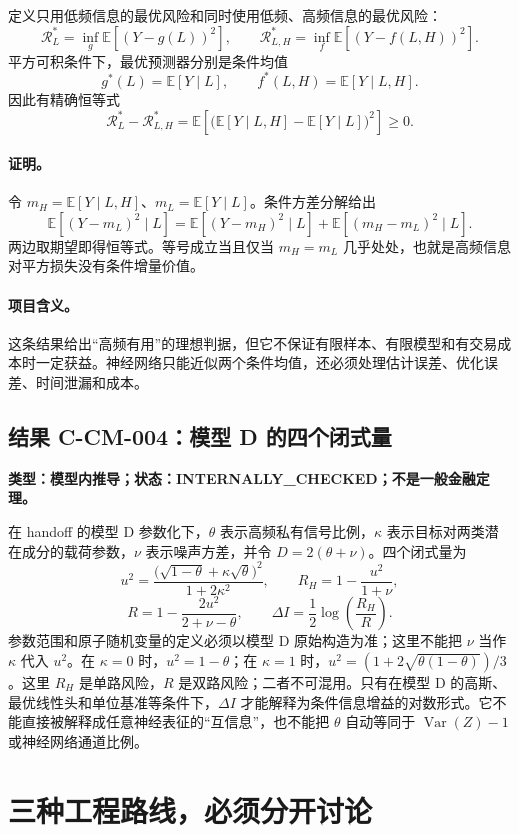 \documentclass[UTF8,11pt,a4paper]{ctexart}
\newcommand{\E}{\mathbb E}
\newcommand{\R}{\mathcal R}
\begin{document}
定义只用低频信息的最优风险和同时使用低频、高频信息的最优风险：
\[
 \R_L^*=\inf_g \E[(Y-g(L))^2],\qquad
 \R_{L,H}^*=\inf_f \E[(Y-f(L,H))^2].
\]
平方可积条件下，最优预测器分别是条件均值
\[
 g^*(L)=\E[Y\mid L],\qquad f^*(L,H)=\E[Y\mid L,H].
\]
因此有精确恒等式
\[
 \boxed{\R_L^*-\R_{L,H}^*
 =\E\!\left[\big(\E[Y\mid L,H]-\E[Y\mid L]\big)^2\right]\ge 0.}
\]

\paragraph{证明。} 令 $m_H=\E[Y\mid L,H]$、$m_L=\E[Y\mid L]$。条件方差分解给出
\[
 \E[(Y-m_L)^2\mid L]
 =\E[(Y-m_H)^2\mid L]+\E[(m_H-m_L)^2\mid L].
\]
两边取期望即得恒等式。等号成立当且仅当 $m_H=m_L$ 几乎处处，也就是高频信息对平方损失没有条件增量价值。

\paragraph{项目含义。} 这条结果给出“高频有用”的理想判据，但它不保证有限样本、有限模型和有交易成本时一定获益。神经网络只能近似两个条件均值，还必须处理估计误差、优化误差、时间泄漏和成本。

\subsection{结果 C-CM-004：模型 D 的四个闭式量}
\textbf{类型：模型内推导；状态：INTERNALLY\_CHECKED；不是一般金融定理。}

在 handoff 的模型 D 参数化下，$\theta$ 表示高频私有信号比例，$\kappa$ 表示目标对两类潜在成分的载荷参数，$\nu$ 表示噪声方差，并令 $D=2(\theta+\nu)$。四个闭式量为
\[
 u^2=\frac{\bigl(\sqrt{1-\theta}+\kappa\sqrt\theta\bigr)^2}{1+2\kappa^2},\qquad
 R_H=1-\frac{u^2}{1+\nu},
\]
\[
 R=1-\frac{2u^2}{2+\nu-\theta},\qquad
 \Delta I=\frac12\log\!\left(\frac{R_H}{R}\right).
\]
参数范围和原子随机变量的定义必须以模型 D 原始构造为准；这里不能把 $\nu$ 当作 $\kappa$ 代入 $u^2$。在 $\kappa=0$ 时，$u^2=1-\theta$；在 $\kappa=1$ 时，$u^2=(1+2\sqrt{\theta(1-\theta)})/3$。这里 $R_H$ 是单路风险，$R$ 是双路风险；二者不可混用。只有在模型 D 的高斯、最优线性头和单位基准等条件下，$\Delta I$ 才能解释为条件信息增益的对数形式。它不能直接被解释成任意神经表征的“互信息”，也不能把 $\theta$ 自动等同于 $\operatorname{Var}(Z)-1$ 或神经网络通道比例。

\section{三种工程路线，必须分开讨论}
\end{document}
